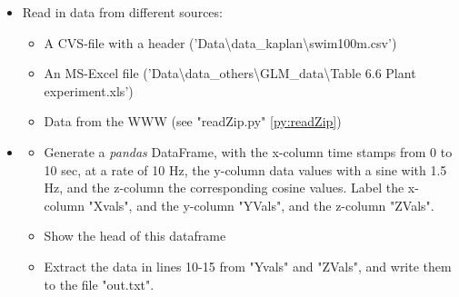 \begin{itemize}
  \item Read in data from different sources:
  \begin{itemize}
    \item A CVS-file with a header ('Data\textbackslash data\_kaplan\textbackslash swim100m.csv')
    \item An MS-Excel file ('Data\textbackslash data\_others\textbackslash GLM\_data\textbackslash Table 6.6 Plant experiment.xls')
    \item Data from the WWW (see "readZip.py" \ref{py:readZip})
  \end{itemize}
  \item
  \begin{itemize}
      \item Generate a \emph{pandas} DataFrame, with the x-column time stamps from 0 to 10 sec, at a rate of 10 Hz, the y-column data values with a sine with 1.5 Hz, and the z-column the corresponding cosine values. Label the x-column "Xvals", and the y-column "YVals", and the z-column "ZVals".
      \item Show the head of this dataframe
      \item Extract the data in lines 10-15 from "Yvals" and "ZVals", and write them to the file "out.txt".
  \end{itemize}
\end{itemize}
